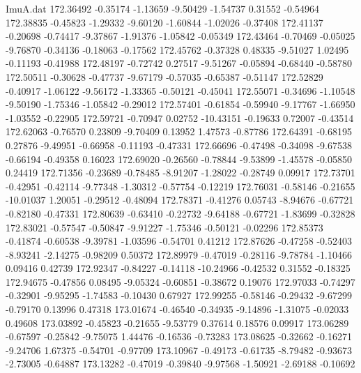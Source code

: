 \begin{filecontents}{ImuA.dat}
 172.36492   -0.35174   -1.13659   -9.50429   -1.54737    0.31552   -0.54964
 172.38835   -0.45823   -1.29332   -9.60120   -1.60844   -1.02026   -0.37408
 172.41137   -0.20698   -0.74417   -9.37867   -1.91376   -1.05842   -0.05349
 172.43464   -0.70469   -0.05025   -9.76870   -0.34136   -0.18063   -0.17562
 172.45762   -0.37328    0.48335   -9.51027    1.02495   -0.11193   -0.41988
 172.48197   -0.72742    0.27517   -9.51267   -0.05894   -0.68440   -0.58780
 172.50511   -0.30628   -0.47737   -9.67179   -0.57035   -0.65387   -0.51147
 172.52829   -0.40917   -1.06122   -9.56172   -1.33365   -0.50121   -0.45041
 172.55071   -0.34696   -1.10548   -9.50190   -1.75346   -1.05842   -0.29012
 172.57401   -0.61854   -0.59940   -9.17767   -1.66950   -1.03552   -0.22905
 172.59721   -0.70947    0.02752  -10.43151   -0.19633    0.72007   -0.43514
 172.62063   -0.76570    0.23809   -9.70409    0.13952    1.47573   -0.87786
 172.64391   -0.68195    0.27876   -9.49951   -0.66958   -0.11193   -0.47331
 172.66696   -0.47498   -0.34098   -9.67538   -0.66194   -0.49358    0.16023
 172.69020   -0.26560   -0.78844   -9.53899   -1.45578   -0.05850    0.24419
 172.71356   -0.23689   -0.78485   -8.91207   -1.28022   -0.28749    0.09917
 172.73701   -0.42951   -0.42114   -9.77348   -1.30312   -0.57754   -0.12219
 172.76031   -0.58146   -0.21655  -10.01037    1.20051   -0.29512   -0.48094
 172.78371   -0.41276    0.05743   -8.94676   -0.67721   -0.82180   -0.47331
 172.80639   -0.63410   -0.22732   -9.64188   -0.67721   -1.83699   -0.32828
 172.83021   -0.57547   -0.50847   -9.91227   -1.75346   -0.50121   -0.02296
 172.85373   -0.41874   -0.60538   -9.39781   -1.03596   -0.54701    0.41212
 172.87626   -0.47258   -0.52403   -8.93241   -2.14275   -0.98209    0.50372
 172.89979   -0.47019   -0.28116   -9.78784   -1.10466    0.09416    0.42739
 172.92347   -0.84227   -0.14118  -10.24966   -0.42532    0.31552   -0.18325
 172.94675   -0.47856    0.08495   -9.05324   -0.60851   -0.38672    0.19076
 172.97033   -0.74297   -0.32901   -9.95295   -1.74583   -0.10430    0.67927
 172.99255   -0.58146   -0.29432   -9.67299   -0.79170    0.13996    0.47318
 173.01674   -0.46540   -0.34935   -9.14896   -1.31075   -0.02033    0.49608
 173.03892   -0.45823   -0.21655   -9.53779    0.37614    0.18576    0.09917
 173.06289   -0.67597   -0.25842   -9.75075    1.44476   -0.16536   -0.73283
 173.08625   -0.32662   -0.16271   -9.24706    1.67375   -0.54701   -0.97709
 173.10967   -0.49173   -0.61735   -8.79482   -0.93673   -2.73005   -0.64887
 173.13282   -0.47019   -0.39840   -9.97568   -1.50921   -2.69188   -0.10692

\end{filecontents}
